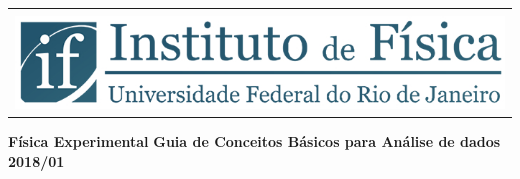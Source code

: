 \begin{titlepage}

\begin{center}
\begin{tabular}{@{}l}
\mbox{}\\[1mm]       
\hspace{0.8cm}
\includegraphics[width=14cm]{fig/logoiftop.jpg}
\end{tabular}%
%


\vskip 3.5cm
{\bf  \Huge Física Experimental}
\vskip 0.2cm
{\bf  \Huge Guia de Conceitos Básicos para Análise de dados}
\vskip 7cm
{\bf \Large  2018/01}

\end{center}

\vfill


\end{titlepage}


